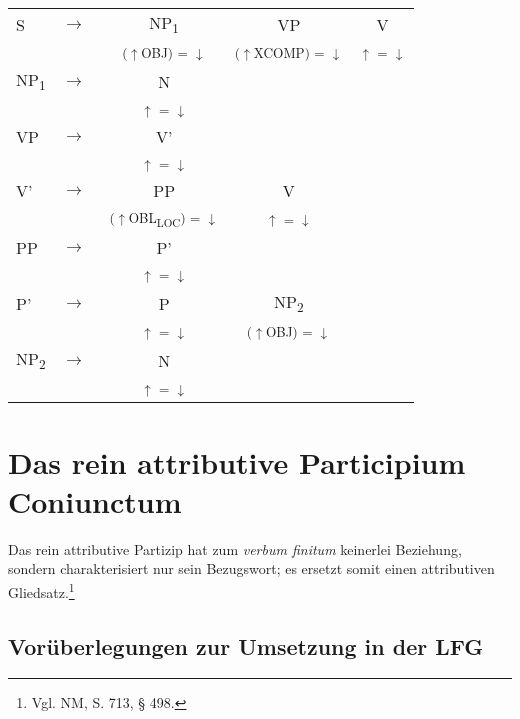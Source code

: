 \documentclass[12pt,a4paper]{article}
\begin{document}
\begin{singlespace}
\renewcommand{\arraystretch}{1}  
\begin{tabular}{ l  l  c  c  c }
  S & $\rightarrow$ & NP\textsubscript{1} & VP & V\\
   & $\qquad$ & \textsuperscript{($\uparrow$OBJ) = $\downarrow$} & \textsuperscript{($\uparrow$XCOMP) = $\downarrow$} & \textsuperscript{$\uparrow$ = $\downarrow$} \\
    NP\textsubscript{1} & $\rightarrow$ & N \\
   & $\qquad$ & \textsuperscript{$\uparrow$ = $\downarrow$} \\
    VP & $\rightarrow$ & V' \\
   & $\qquad$ & \textsuperscript{$\uparrow$ = $\downarrow$} \\
    V' & $\rightarrow$ & PP & V & \\
   & $\qquad$ & \textsuperscript{($\uparrow$OBL\textsubscript{LOC}) = $\downarrow$ } & \textsuperscript{$\uparrow$ = $\downarrow$} \\
    PP & $\rightarrow$ & P' \\
	& $\qquad$   & \textsuperscript{$\uparrow$ = $\downarrow$} \\
    P' & $\rightarrow$ & P & NP\textsubscript{2} \\
   & $\qquad$ & \textsuperscript{$\uparrow$ = $\downarrow$} & \textsuperscript{($\uparrow$OBJ) = $\downarrow$} \\
    NP\textsubscript{2} & $\rightarrow$ & N \\
   & $\qquad$ & \textsuperscript{$\uparrow$ = $\downarrow$} \\
\end{tabular} 
\end{singlespace}
 

\newpage
\section{Das rein attributive Participium Coniunctum}

Das rein attributive Partizip hat zum \textit{verbum finitum} keinerlei Beziehung, sondern charakterisiert nur sein Bezugswort; es ersetzt somit einen attributiven Gliedsatz.\footnote{Vgl. NM, S. 713, § 498.} \\

\subsection{Vorüberlegungen zur Umsetzung in der LFG}
\end{document}
